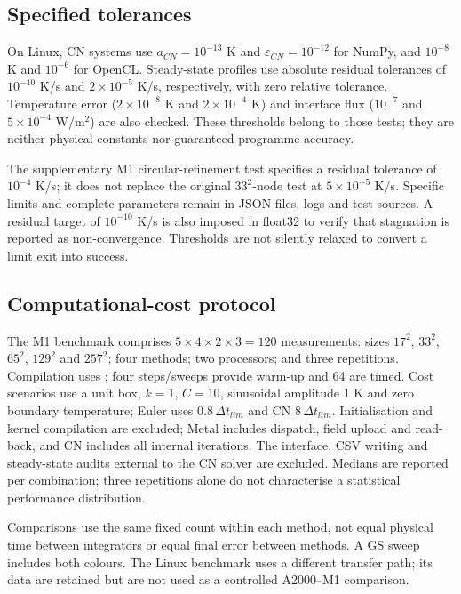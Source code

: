 \documentclass[11pt,a4paper]{article}
\newcommand{\code}[1]{\texttt{\detokenize{#1}}}
\newcommand{\dt}{\Delta t}
\begin{document}
\subsection{Specified tolerances}
On Linux, CN systems use $a_{CN}=10^{-13}$ K and $\varepsilon_{CN}=10^{-12}$ for NumPy, and $10^{-8}$ K and $10^{-6}$ for OpenCL. Steady-state profiles use absolute residual tolerances of $10^{-10}$ K/s and $2\times10^{-5}$ K/s, respectively, with zero relative tolerance. Temperature error ($2\times10^{-8}$ K and $2\times10^{-4}$ K) and interface flux ($10^{-7}$ and $5\times10^{-4}$ W/m$^2$) are also checked. These thresholds belong to those tests; they are neither physical constants nor guaranteed programme accuracy.

The supplementary M1 circular-refinement test specifies a residual tolerance of $10^{-4}$ K/s; it does not replace the original $33^2$-node test at $5\times10^{-5}$ K/s. Specific limits and complete parameters remain in JSON files, logs and test sources. A residual target of $10^{-10}$ K/s is also imposed in float32 to verify that stagnation is reported as non-convergence. Thresholds are not silently relaxed to convert a limit exit into success.

\subsection{Computational-cost protocol}
The M1 benchmark comprises $5\times4\times2\times3=120$ measurements: sizes $17^2$, $33^2$, $65^2$, $129^2$ and $257^2$; four methods; two processors; and three repetitions. Compilation uses \code{-O}; four steps/sweeps provide warm-up and 64 are timed. Cost scenarios use a unit box, $k=1$, $C=10$, sinusoidal amplitude 1 K and zero boundary temperature; Euler uses $0.8\,\dt_{lim}$ and CN $8\,\dt_{lim}$. Initialisation and kernel compilation are excluded; Metal includes dispatch, field upload and read-back, and CN includes all internal iterations. The interface, CSV writing and steady-state audits external to the CN solver are excluded. Medians are reported per combination; three repetitions alone do not characterise a statistical performance distribution.

Comparisons use the same fixed count within each method, not equal physical time between integrators or equal final error between methods. A GS sweep includes both colours. The Linux benchmark uses a different transfer path; its data are retained but are not used as a controlled A2000--M1 comparison.
\end{document}
